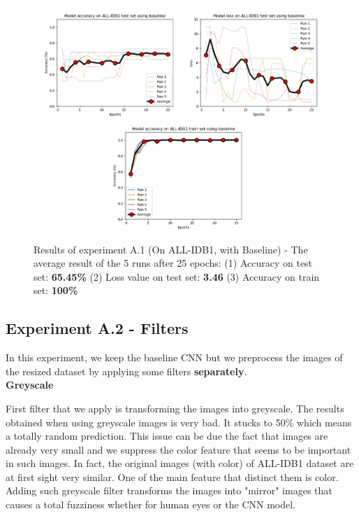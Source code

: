 \documentclass[11pt, openany]{report}
\theoremstyle{plain}
\theoremstyle{definition}
\theoremstyle{remark}
\begin{document}
\begin{figure}[H]
  \centering
  \includegraphics[scale=0.5]{Code/ch6-LeukemiaSubtypes/figures_result/ALL_IDB1/all_idb1-baseline.PNG}
  \caption{Results of experiment A.1 (On ALL-IDB1, with Baseline) - The average result of the 5 runs after 25 epochs: (1) Accuracy on test set: \textbf{65.45\%} (2) Loss value on test set: \textbf{3.46} (3) Accuracy on train set: \textbf{100\%}}
  \label{fig:results-A1}
\end{figure}


\subsection{Experiment A.2 - Filters}
In this experiment, we keep the baseline CNN but we preprocess the images of the resized dataset by applying some filters \textbf{separately}. \\

\textbf{Greyscale}

First filter that we apply is transforming the images into greyscale. The results obtained when using greyscale images is very bad. It stucks to 50\% which means a totally random prediction. This issue can be due the fact that images are already very small and we suppress the color feature that seems to be important in such images. In fact, the original images (with color) of ALL-IDB1 dataset are at first sight very similar. One of the main feature that distinct them is color. Adding such greyscale filter transforms the images into "mirror" images that causes a total fuzziness whether for human eyes or the CNN model. \\ 
\end{document}
